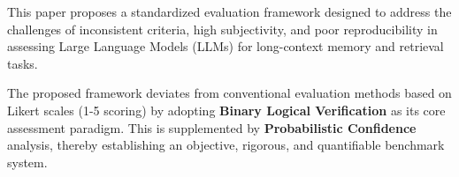 This paper proposes a standardized evaluation framework designed to address the challenges of inconsistent criteria, high subjectivity, and poor reproducibility in assessing Large Language Models (LLMs) for long-context memory and retrieval tasks.

The proposed framework deviates from conventional evaluation methods based on Likert scales (1-5 scoring) by adopting \textbf{Binary Logical Verification} as its core assessment paradigm. This is supplemented by \textbf{Probabilistic Confidence} analysis, thereby establishing an objective, rigorous, and quantifiable benchmark system.




